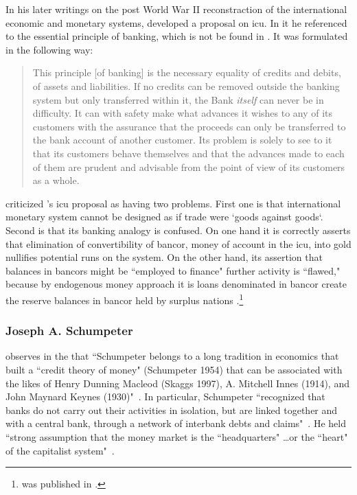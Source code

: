 In his later writings on the post World War II reconstraction of the international economic and monetary systems, \citeauthor{keynes1980_25} developed a proposal on \acf{icu}. In it he referenced to the essential principle of banking, which is not be found in \cite{innes1910,innes1913,innes1914}. It was formulated in the following way:

\begin{quote}
This principle [of banking] is the necessary equality of credits and debits, of assets and liabilities. If no credits can be removed outside the banking system but only transferred within it, the Bank \textit{itself} can never be in difficulty. It can with safety make what advances it wishes to any of its customers with the assurance that the proceeds can only be transferred to the bank account of another customer. Its problem is solely to see to it that its customers behave themselves and that the advances made to each of them are prudent and advisable from the point of view of its customers as a whole.~\citep[pp.~44-45]{keynes1980_25}
\end{quote}

\cite{wray1999} criticized \citeauthor{keynes1980_25}'s \ac{icu} proposal as having two problems. First one is that international monetary system cannot be designed as if trade were `goods against goods`. Second is that its banking analogy is confused. On one hand it is correctly asserts that elimination of convertibility of bancor, money of account in the \ac{icu}, into gold nullifies potential runs on the system. On the other hand, its assertion that balances in bancors might be ``employed to finance" further activity is ``flawed," because by endogenous money approach it is loans denominated in bancor create the reserve balances in bancor held by surplus nations \citep[p.~194-198, footnote 16]{wray1999}.\footnote{\cite{wray1999} was published in \cite{harvey1999}.}

%
%
\subsubsection{Joseph A. Schumpeter}

\citeauthor{lakomski} observes in the \citeyear{lakomski} that ``Schumpeter belongs to a long tradition in economics that built a ``credit theory of money" (Schumpeter 1954) that can be associated with the likes of Henry Dunning Macleod (Skaggs 1997), A. Mitchell Innes (1914), and John Maynard Keynes (1930)"~\citep[p.~503]{lakomski}. In particular, Schumpeter ``recognized that banks do not carry out their activities in isolation, but are linked together and with a central bank, through a network of interbank debts and claims"~\citep[p.~502]{lakomski}. He held ``strong assumption that the money market is the ``headquarters" \dots or the ``heart" of the capitalist system"~\citep[p.~507]{lakomski}.

